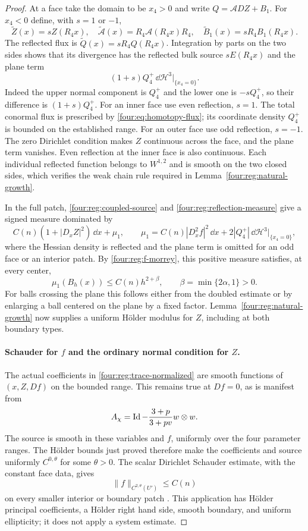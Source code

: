\begin{proof}
At a face take the domain to be $x_4>0$ and write
$Q=\mathcal A DZ+B_1$.  For $x_4<0$ define, with $s=1$ or $-1$,
\[
 \widetilde Z(x)=sZ(R_4x),\quad
 \widetilde{\mathcal A}(x)=R_4\mathcal A(R_4x)R_4,\quad
 \widetilde B_1(x)=sR_4B_1(R_4x).
\]
The reflected flux is $\widetilde Q(x)=sR_4Q(R_4x)$.
Integration by parts on the two sides shows that its divergence
has the reflected bulk source $sE(R_4x)$ and the plane term
\begin{equation}\label{four:reg:reflection-measure}
 (1+s)Q_4^+\,\dd\mathcal H^3|_{\{x_4=0\}}.
\end{equation}
Indeed the upper normal component is $Q_4^+$ and the lower one is
$-sQ_4^+$, so their difference is $(1+s)Q_4^+$.
For an inner face use even reflection, $s=1$.  The total conormal
flux is prescribed by \eqref{four:eq:homotopy-flux}; its coordinate
density $Q_4^+$ is bounded on the established range.  For an outer
face use odd reflection, $s=-1$.  The zero Dirichlet condition
makes $Z$ continuous across the face, and the plane term vanishes.
Even reflection at the inner face is also continuous.  Each
individual reflected function belongs to $W^{1,2}$ and is smooth
on the two closed sides, which verifies the weak chain rule
required in Lemma~\ref{four:reg:natural-growth}.

In the full patch, \eqref{four:reg:coupled-source} and
\eqref{four:reg:reflection-measure} give a signed measure dominated by
\[
 C(n)(1+|D_xZ|^2)\,\dd x+\mu_1,\qquad
 \mu_1=C(n)|D_x^2f|^2\,\dd x
               +2|Q_4^+|\,\dd\mathcal H^3|_{\{x_4=0\}},
\]
where the Hessian density is reflected and the plane term is
omitted for an odd face or an interior patch.  By
\eqref{four:reg:f-morrey}, this positive measure satisfies, at every
center,
\[
 \mu_1(B_h(x))\le C(n)h^{2+\beta},\qquad
                   \beta=\min\{2\alpha,1\}>0.
\]
For balls crossing the plane this follows either from the doubled
estimate or by enlarging a ball centered on the plane by a fixed
factor.  Lemma~\ref{four:reg:natural-growth} now supplies a uniform
H\"older modulus for $Z$, including at both boundary types.

\paragraph{Schauder for $f$ and the ordinary normal condition for $Z$.}
The actual coefficients in \eqref{four:reg:trace-normalized} are smooth
functions of $(x,Z,Df)$ on the bounded range.  This remains true
at $Df=0$, as is manifest from
\[
 A_\chi=\operatorname{Id}-\frac{3+p}{3+pv}w\otimes w.
\]
The source is smooth in these variables and $f$, uniformly over
the four parameter ranges.  The H\"older bounds just proved
therefore make the coefficients and source uniformly
$C^{0,\theta}$ for some $\theta>0$.  The scalar Dirichlet Schauder
estimate, with the constant face data, gives
\begin{equation}\label{four:reg:f-schauder}
 \|f\|_{C^{2,\theta}(U')}\le C(n)
\end{equation}
on every smaller interior or boundary patch \cite{GilbargTrudinger2001}.
This application has H\"older principal coefficients, a H\"older
right hand side, smooth boundary, and uniform ellipticity; it
does not apply a system estimate.


\end{proof}
